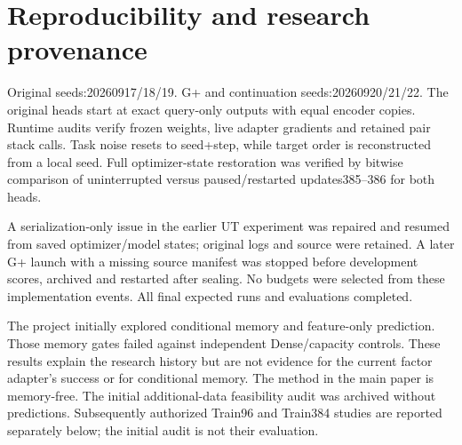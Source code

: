 \section{Reproducibility and research provenance}\label{reproducibility-and-research-provenance}

Original seeds:20260917/18/19. G+ and continuation seeds:20260920/21/22.
The original heads start at exact query-only outputs with equal encoder copies.
Runtime audits verify frozen weights, live adapter gradients and retained pair
stack calls. Task noise resets to seed+step, while target order is reconstructed
from a local seed. Full optimizer-state restoration was verified by bitwise
comparison of uninterrupted versus paused/restarted updates385--386 for both heads.

A serialization-only issue in the earlier UT experiment was repaired and resumed
from saved optimizer/model states; original logs and source were retained. A
later G+ launch with a missing source manifest was stopped before development
scores, archived and restarted after sealing. No budgets were selected from
these implementation events. All final expected runs and evaluations completed.

The project initially explored conditional memory and feature-only prediction.
Those memory gates failed against independent Dense/capacity controls. These
results explain the research history but are not evidence for the current
factor adapter's success or for conditional memory. The method in the main
paper is memory-free. The initial additional-data feasibility audit was archived
without predictions. Subsequently authorized Train96 and Train384 studies are
reported separately below; the initial audit is not their evaluation.

